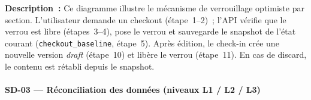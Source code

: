 \noindent\textbf{Description~:} Ce diagramme illustre le mécanisme de verrouillage optimiste par section. L'utilisateur demande un checkout (étape~1--2)~; l'API vérifie que le verrou est libre (étapes~3--4), pose le verrou et sauvegarde le snapshot de l'état courant (\texttt{checkout\_baseline}, étape~5). Après édition, le check-in crée une nouvelle version \textit{draft} (étape~10) et libère le verrou (étape~11). En cas de discard, le contenu est rétabli depuis le snapshot.

\paragraph{SD-03 --- Réconciliation des données (niveaux L1 / L2 / L3)}

